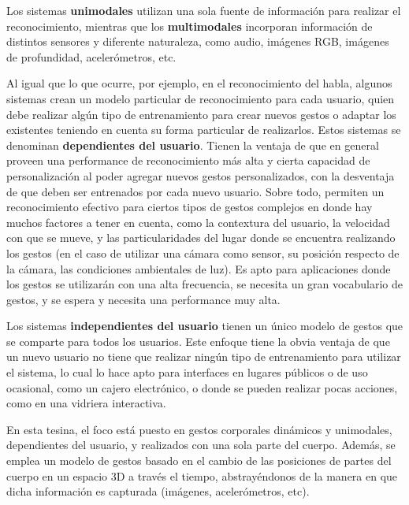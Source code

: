 \begin{itemize}

Los sistemas \textbf{unimodales} utilizan una sola fuente de información para realizar el reconocimiento, mientras que los \textbf{multimodales} incorporan información de distintos sensores y diferente naturaleza, como audio, imágenes RGB, imágenes de profundidad, acelerómetros, etc.



Al igual que lo que ocurre, por ejemplo, en el reconocimiento del habla, algunos sistemas crean un modelo particular de reconocimiento para cada usuario, quien debe realizar algún tipo de entrenamiento para crear nuevos gestos o adaptar los existentes teniendo en cuenta su forma particular de realizarlos. Estos sistemas se denominan \textbf{dependientes del usuario}. Tienen la ventaja de que en general proveen una performance de reconocimiento más alta y cierta capacidad de personalización al poder agregar nuevos gestos personalizados, con la desventaja de que deben ser entrenados por cada nuevo usuario. Sobre todo, permiten un reconocimiento efectivo para ciertos tipos de gestos complejos en donde hay muchos factores a tener en cuenta, como la contextura del usuario, la velocidad con que se mueve, y las particularidades del lugar donde se encuentra realizando los gestos (en el caso de utilizar una cámara como sensor, su posición respecto de la cámara, las condiciones ambientales de luz). Es apto para aplicaciones donde los gestos se utilizarán con una alta frecuencia, se necesita un gran vocabulario de gestos,  y se espera y necesita una performance muy alta.

Los sistemas \textbf{independientes del usuario} tienen un único modelo de gestos que se comparte para todos los usuarios. Este enfoque tiene la obvia ventaja de que un nuevo usuario no tiene que realizar ningún tipo de entrenamiento para utilizar el sistema, lo cual lo hace apto para interfaces en lugares públicos o de uso ocasional, como un cajero electrónico, o donde se pueden realizar pocas acciones, como en una vidriera interactiva.

\end{itemize}

En esta tesina, el foco está puesto en gestos corporales dinámicos y unimodales, dependientes del usuario, y realizados con una sola parte del cuerpo. Además, se emplea un modelo de gestos basado en el cambio de las posiciones de partes del cuerpo en un espacio 3D a través el tiempo, abstrayéndonos de la manera en que dicha información es capturada (imágenes, acelerómetros, etc). 

